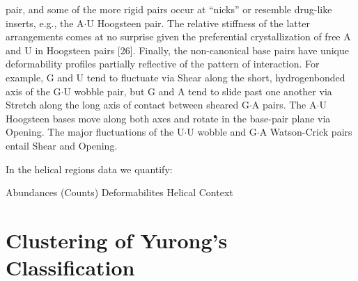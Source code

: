 pair, and some of the more  rigid pairs occur at ``nicks'' or resemble
drug-like inserts,  e.g., the  A$\cdot$U Hoogsteen pair.  The relative
stiffness of  the latter arrangements  comes at no surprise  given the
preferential crystallization of free A  and U in Hoogsteen pairs [26].
Finally,  the  non-canonical  base  pairs  have  unique  deformability
profiles  partially  reflective of  the  pattern  of interaction.  For
example,  G  and  U tend  to  fluctuate  via  Shear along  the  short,
hydrogenbonded axis of the G$\cdot$U wobble  pair, but G and A tend to
slide  past one another  via Stretch  along the  long axis  of contact
between sheared  G$\cdot$A pairs.  The A$\cdot$U Hoogsteen  bases move
along both  axes and  rotate in the  base-pair plane via  Opening. The
major fluctuations of the  U$\cdot$U wobble and G$\cdot$A Watson-Crick
pairs entail Shear and Opening.







In the helical regions data we quantify:

Abundances (Counts)
Deformabilites
Helical Context




\section{Clustering of Yurong's Classification}



